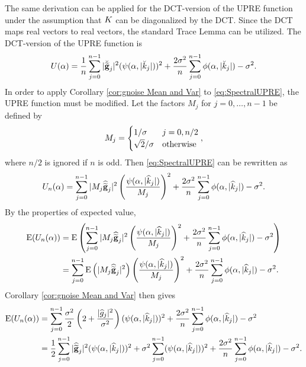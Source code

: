 The same derivation can be applied for the DCT-version of the UPRE function under the assumption that $K$ can be diagonalized by the DCT. Since the DCT maps real vectors to real vectors, the standard Trace Lemma can be utilized. The DCT-version of the UPRE function is
\begin{equation}
U(\alpha) = \frac{1}{n}\sum_{j = 0}^{n-1} |\breve{\widetilde{\mathbf{g}}}_j|^2(\psi(\alpha,|\breve{k}_j|))^2 + \frac{2\sigma^2}{n}\sum_{j = 0}^{n-1} \phi(\alpha,|\breve{k}_j|) - \sigma^2.
\label{eq:UPRE DCT}
\end{equation}
In order to apply Corollary \ref{cor:gnoise Mean and Var} to \eqref{eq:SpectralUPRE}, the UPRE function must be modified. Let the factors $M_j$ for $j = 0,\ldots,n-1$ be defined by
\[M_j = \begin{cases}
1/\sigma & j = 0, n/2 \\
\sqrt{2}/\sigma & \text{otherwise}
\end{cases},\]
where $n/2$ is ignored if $n$ is odd. Then \eqref{eq:SpectralUPRE} can be rewritten as
\begin{equation}
\label{eq:SpectralUPREnModified}
U_n(\alpha) = \sum_{j = 0}^{n-1} |M_j\widehat{\widetilde{\mathbf{g}}}_j|^2\left(\frac{\psi(\alpha,|\widehat{k}_j|)}{M_j}\right)^2 + \frac{2\sigma^2}{n}\sum_{j = 0}^{n-1} \phi(\alpha,|\widehat{k}_j|) - \sigma^2.
\end{equation}
By the properties of expected value,
\begin{align*}
\operatorname{E}(U_n(\alpha)) &= \operatorname{E}\left(\sum_{j = 0}^{n-1} |M_j\widehat{\widetilde{\mathbf{g}}}_j|^2\left(\frac{\psi(\alpha,|\widehat{k}_j|)}{M_j}\right)^2 + \frac{2\sigma^2}{n}\sum_{j = 0}^{n-1} \phi(\alpha,|\widehat{k}_j|) - \sigma^2\right) \\
&= \sum_{j = 0}^{n-1} \operatorname{E}\left(|M_j\widehat{\widetilde{\mathbf{g}}}_j|^2\right)\left(\frac{\psi(\alpha,|\widehat{k}_j|)}{M_j}\right)^2 + \frac{2\sigma^2}{n}\sum_{j = 0}^{n-1} \phi(\alpha,|\widehat{k}_j|) - \sigma^2.
\end{align*}
Corollary \ref{cor:gnoise Mean and Var} then gives
\begin{equation}
\begin{split}
\operatorname{E}(U_n(\alpha)) &= \sum_{j = 0}^{n-1} \frac{\sigma^2}{2}\left(2 + \frac{|\widehat{g}_j|^2}{\sigma^2}\right)(\psi(\alpha,|\widehat{k}_j|))^2 + \frac{2\sigma^2}{n}\sum_{j = 0}^{n-1} \phi(\alpha,|\widehat{k}_j|) - \sigma^2 \\
&= \frac{1}{2}\sum_{j = 0}^{n-1} |\widehat{\widetilde{\mathbf{g}}}_j|^2(\psi(\alpha,|\widehat{k}_j|))^2 + \sigma^2\sum_{j = 0}^{n-1} (\psi(\alpha,|\widehat{k}_j|))^2 + \frac{2\sigma^2}{n}\sum_{j = 0}^{n-1} \phi(\alpha,|\widehat{k}_j|) - \sigma^2.
\end{split}
\label{eq:UPRE Expected Value}
\end{equation}
